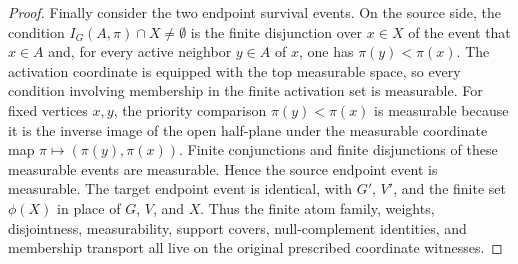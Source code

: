 \begin{proof}
Finally consider the two endpoint survival events.  On the source side, the
condition \(I_G(A,\pi)\cap X\ne\emptyset\) is the finite disjunction over
\(x\in X\) of the event that \(x\in A\) and, for every active neighbor
\(y\in A\) of \(x\), one has \(\pi(y)<\pi(x)\).  The activation coordinate
is equipped with the top measurable space, so every condition involving
membership in the finite activation set is measurable.  For fixed vertices
\(x,y\), the priority comparison \(\pi(y)<\pi(x)\) is measurable because it
is the inverse image of the open half-plane under the measurable coordinate
map \(\pi\mapsto(\pi(y),\pi(x))\).  Finite conjunctions and finite
disjunctions of these measurable events are measurable.  Hence the source
endpoint event is measurable.  The target endpoint event is identical, with
\(G'\), \(V'\), and the finite set \(\phi(X)\) in place of \(G\), \(V\), and
\(X\).  Thus the finite atom family, weights, disjointness, measurability,
support covers, null-complement identities, and membership transport all
live on the original prescribed coordinate witnesses.
\end{proof}

